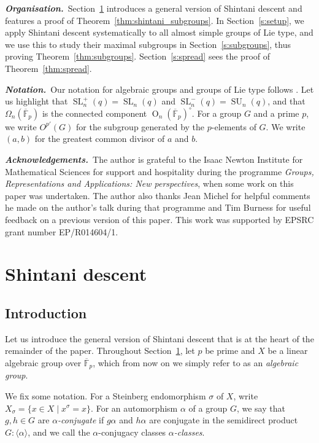 \documentclass[11pt]{article}
\numberwithin{equation}{section}
\theoremstyle{shdefinition}
\theoremstyle{shplain}
\renewcommand{\a}{\alpha}
\newcommand{\s}{\sigma}
\newcommand{\<}{\langle}
\renewcommand{\>}{\rangle}
\newcommand{\F}{\mathbb{F}}
\newcommand{\FF}{\overline{\F}}
\renewcommand{\:}{\colon}
\newcommand{\SL}{\operatorname{SL}}
\newcommand{\SU}{\operatorname{SU}}
\renewcommand{\O}{\operatorname{O}}
\begin{document}
\textbf{\emph{Organisation.}}\ Section~\ref{s:shintani} introduces a general version of Shintani descent and features a proof of Theorem~\ref{thm:shintani_subgroups}. In Section~\ref{s:setup}, we apply Shintani descent systematically to all almost simple groups of Lie type, and we use this to study their maximal subgroups in Section~\ref{s:subgroups}, thus proving Theorem~\ref{thm:subgroups}. Section~\ref{s:spread} sees the proof of Theorem~\ref{thm:spread}.

\textbf{\emph{Notation.}}\ Our notation for algebraic groups and groups of Lie type follows \cite{ref:GorensteinLyonsSolomon98,ref:KleidmanLiebeck}. Let us highlight that $\SL^+_n(q) = \SL_n(q)$ and $\SL^-_n(q) = \SU_n(q)$, and that $\Omega_n(\FF_p)$ is the connected component $\O_n(\FF_p)^\circ$. For a group $G$ and a prime $p$, we write $O^{p'}(G)$ for the subgroup generated by the $p$-elements of $G$. We write $(a,b)$ for the greatest common divisor of $a$ and $b$.

\textbf{\emph{Acknowledgements.}}\ The author is grateful to the Isaac Newton Institute for Mathematical Sciences for support and hospitality during the programme \emph{Groups, Representations and Applications: New perspectives}, when some work on this paper was undertaken. The author also thanks Jean Michel for helpful comments he made on the author's talk during that programme and Tim Burness for useful feedback on a previous version of this paper. This work was supported by EPSRC grant number EP/R014604/1.



\section{Shintani descent} \label{s:shintani}

\subsection{Introduction} \label{ss:shintani}    

Let us introduce the general version of Shintani descent that is at the heart of the remainder of the paper. Throughout Section~\ref{s:shintani}, let $p$ be prime and $X$ be a linear algebraic group over $\FF_p$, which from now on we simply refer to as an \emph{algebraic group}.

We fix some notation. For a Steinberg endomorphism $\s$ of $X$, write 
$
X_{\s} = \{ x \in X \mid x^\s = x \}.
$
For an automorphism $\a$ of a group $G$, we say that $g,h \in G$ are \emph{$\a$-conjugate} if $g\a$ and $h\a$ are conjugate in the semidirect product $G{:}\<\a\>$, and we call the $\a$-conjugacy classes \emph{$\a$-classes}. 
\end{document}
